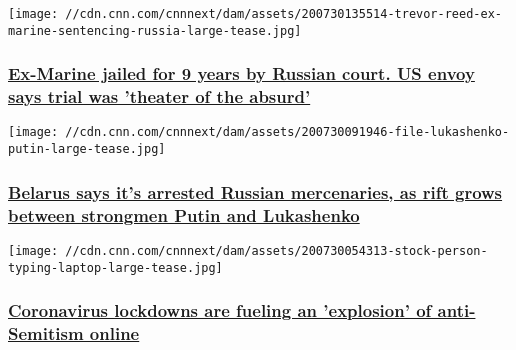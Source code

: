 \href{/2020/07/30/europe/russia-ex-marine-jail-term-intl/index.html}{}

\texttt{[image: //cdn.cnn.com/cnnnext/dam/assets/200730135514-trevor-reed-ex-marine-sentencing-russia-large-tease.jpg]}

\hypertarget{ex-marine-jailed-for-9-years-by-russian-court-us-envoy-says-trial-was-theater-of-the-absurd}{%
\subsubsection{\texorpdfstring{\href{/2020/07/30/europe/russia-ex-marine-jail-term-intl/index.html}{Ex-Marine
jailed for 9 years by Russian court. US envoy says trial was 'theater of
the
absurd'}}{Ex-Marine jailed for 9 years by Russian court. US envoy says trial was 'theater of the absurd'}}\label{ex-marine-jailed-for-9-years-by-russian-court-us-envoy-says-trial-was-theater-of-the-absurd}}

\href{/2020/07/30/europe/belarus-russia-mercenaries-arrests-intl/index.html}{}

\texttt{[image: //cdn.cnn.com/cnnnext/dam/assets/200730091946-file-lukashenko-putin-large-tease.jpg]}

\hypertarget{belarus-says-its-arrested-russian-mercenaries-as-rift-grows-between-strongmen-putin-and-lukashenko}{%
\subsubsection{\texorpdfstring{\href{/2020/07/30/europe/belarus-russia-mercenaries-arrests-intl/index.html}{Belarus
says it's arrested Russian mercenaries, as rift grows between strongmen
Putin and
Lukashenko}}{Belarus says it's arrested Russian mercenaries, as rift grows between strongmen Putin and Lukashenko}}\label{belarus-says-its-arrested-russian-mercenaries-as-rift-grows-between-strongmen-putin-and-lukashenko}}

\href{/2020/07/30/uk/online-anti-semitism-intl-scli-gbr/index.html}{}

\texttt{[image: //cdn.cnn.com/cnnnext/dam/assets/200730054313-stock-person-typing-laptop-large-tease.jpg]}

\hypertarget{coronavirus-lockdowns-are-fueling-an-explosion-of-anti-semitism-online}{%
\subsubsection{\texorpdfstring{\href{/2020/07/30/uk/online-anti-semitism-intl-scli-gbr/index.html}{Coronavirus
lockdowns are fueling an 'explosion' of anti-Semitism
online}}{Coronavirus lockdowns are fueling an 'explosion' of anti-Semitism online}}\label{coronavirus-lockdowns-are-fueling-an-explosion-of-anti-semitism-online}}

